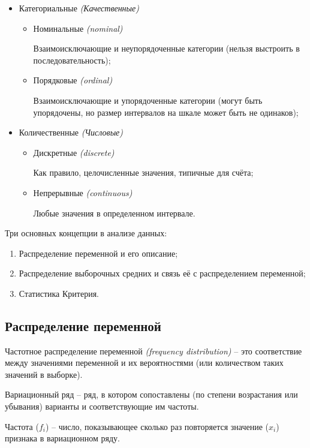 \begin{itemize}
	\item Категориальные \textit{(Качественные)}
	\begin{itemize}
		\item Номинальные \textit{(nominal)}
		
		Взаимоисключающие и неупорядоченные категории (нельзя выстроить в последовательность);
		
		\item Порядковые \textit{(ordinal)}
		
		Взаимоисключающие и упорядоченные категории (могут быть упорядочены, но размер интервалов на шкале может быть не одинаков);
	\end{itemize}
	\item Количественные \textit{(Числовые)}
	\begin{itemize}
		\item Дискретные \textit{(discrete)}
		
		Как правило, целочисленные значения, типичные для счёта;
		
		\item Непрерывные \textit{(continuous)}
		
		Любые значения в определенном интервале.
	\end{itemize}
\end{itemize}

Три основных концепции в анализе данных:

\begin{enumerate}
	\item Распределение переменной и его описание;
	\item Распределение выборочных средних и связь её с распределением переменной;
	\item Статистика Критерия.
\end{enumerate}

\subsection{Распределение переменной}

Частотное распределение переменной \textit{(frequency distribution)} -- это соответствие между значениями переменной и их вероятностями (или количеством таких значений в выборке).

Вариационный ряд -- ряд, в котором сопоставлены (по степени возрастания или убывания) варианты и соответствующие им частоты.

Частота (\colorbox[rgb]{0.95, 0.95, 0.95}{$f_i$}) -- число, показывающее сколько раз повторяется значение (\colorbox[rgb]{0.95, 0.95, 0.95}{$x_i$}) признака в вариационном ряду.

